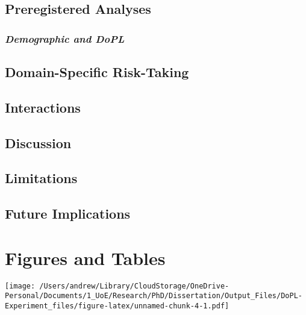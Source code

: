 \documentclass[
  donotrepeattitle,doc, 12pt, a4paper,floatsintext]{apa7}
\begin{document}
\hypertarget{preregistered-analyses-1}{%
\subsection{Preregistered Analyses}\label{preregistered-analyses-1}}

\hypertarget{demographic-and-dopl-1}{%
\subsubsection{\texorpdfstring{\emph{Demographic and DoPL}}{Demographic and DoPL}}\label{demographic-and-dopl-1}}

\hypertarget{domain-specific-risk-taking-1}{%
\subsection{Domain-Specific Risk-Taking}\label{domain-specific-risk-taking-1}}

\hypertarget{interactions-1}{%
\subsection{Interactions}\label{interactions-1}}

\hypertarget{discussion-1}{%
\subsection{Discussion}\label{discussion-1}}

\hypertarget{limitations}{%
\subsection{Limitations}\label{limitations}}

\hypertarget{future-implications}{%
\subsection{Future Implications}\label{future-implications}}

\newpage

\hypertarget{figures-and-tables}{%
\section{Figures and Tables}\label{figures-and-tables}}

\texttt{[image: /Users/andrew/Library/CloudStorage/OneDrive-Personal/Documents/1\_UoE/Research/PhD/Dissertation/Output\_Files/DoPL-Experiment\_files/figure-latex/unnamed-chunk-4-1.pdf]}
\end{document}
